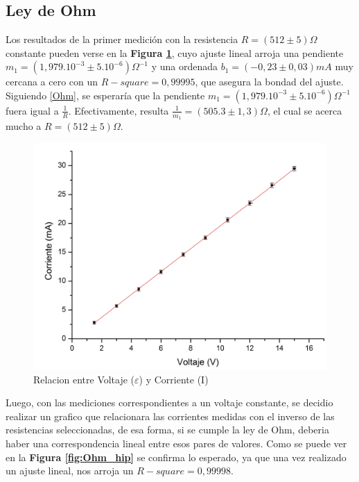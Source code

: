 \documentclass[11pt,a4paper]{article}
\begin{document}
\subsection{Ley de Ohm}

Los resultados de la primer medición con la resistencia $R = (512 \pm 5)\Omega$ constante pueden verse en la \textbf{Figura \ref{fig:Ohm_lin}}, cuyo ajuste lineal arroja una pendiente $m_1 = (1,979.10^{-3} \pm 5.10^{-6})\Omega^{-1}$ y una ordenada $b_1 = (-0,23\pm 0,03)mA$ muy cercana a cero con un $R-square = 0,99995$, que asegura la bondad del ajuste. Siguiendo \eqref{Ohm}, se esperaría que la pendiente $m_1 = (1,979.10^{-3} \pm 5.10^{-6})\Omega^{-1}$ fuera igual a $\frac{1}{R}$. Efectivamente, resulta $\frac{1}{m_1} = (505.3 \pm 1,3)\Omega$, el cual se acerca mucho a $R = (512 \pm 5)\Omega$.

\begin{figure}[h]
  \centering
  \includegraphics[scale=0.4]{Corriente_vs_Voltaje}
  \caption{Relacion entre Voltaje ($\varepsilon$) y Corriente (I)}
  \label{fig:Ohm_lin}
\end{figure}

Luego, con las mediciones correspondientes a un voltaje constante, se decidio realizar un grafico que relacionara las corrientes medidas con el inverso de las resistencias seleccionadas, de esa forma, si se cumple la ley de Ohm, deberia haber una correspondencia lineal entre esos pares de valores. Como se puede ver en la \textbf{Figura \ref{fig:Ohm_hip}} se confirma lo esperado, ya que una vez realizado un ajuste lineal, nos arroja un $R-square = 0,99998$.
\end{document}
